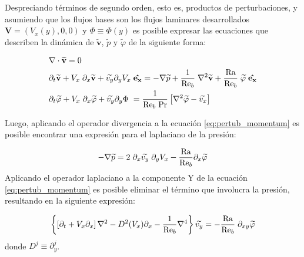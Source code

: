Despreciando términos de segundo orden, esto es, productos de perturbaciones, y asumiendo que los flujos bases son los flujos laminares desarrollados $\mathbf{V} = (V_x(y),0,0)$ y $\Phi \equiv \Phi(y)$ es posible expresar las ecuaciones que describen la dinámica de $\widetilde{\mathbf{v}}$, $\widetilde{p}$ y $\widetilde{\varphi}$ de la siguiente forma: 

\begin{align}
&\nabla \cdot \mathbf{\widetilde{v}} = 0
\label{eq:pertub_continuity} \\
&\partial_t \mathbf{\widetilde{v}} + V_x \hspace{1mm} \partial_x \mathbf{\widetilde{v}} + {\widetilde{v_y}} \partial_y V_x \hspace{1mm} \mathbf{\hat{e_x}} = - \nabla \widetilde{p} + \frac{1}{\text{Re}_b} \hspace{1mm} \nabla^2 \mathbf{\widetilde{v}} + \frac{\text{Ra}}{\text{Re}_b} \hspace{1mm} \widetilde{\varphi} \hspace{1mm}  \mathbf{\hat{e_x}} 
\label{eq:pertub_momentum} \\
&\partial_t {\widetilde{\varphi}} + V_x \hspace{1mm} \partial_x {\widetilde{\varphi}} + {\widetilde{v_y}} \partial_y \Phi \hspace{1mm} = \frac{1}{\text{Re}_b \hspace{1mm} \text{Pr}} \left[ \nabla^2 \widetilde{\varphi} - \widetilde{v_x} \right]
\label{eq:pertub_energy} 
\end{align} 

Luego, aplicando el operador divergencia a la ecuación \ref{eq:pertub_momentum} es posible encontrar una expresión para el laplaciano de la presión:

\begin{equation}
- \nabla \widetilde{p} = 2 \hspace{1mm} \partial_x \widetilde{v_y} \hspace{1mm} \partial_y V_x - \frac{\text{Ra}}{\text{Re}_b} \partial_x \widetilde{\varphi}
\label{eq:pressure_eigen}
\end{equation}
Aplicando el operador laplaciano a la componente Y de la ecuación \ref{eq:pertub_momentum} es posible eliminar el término que involucra la presión, resultando en la siguiente expresión:

\begin{equation}
\left\lbrace \left[ \partial_t + V_x \partial_x \right] \nabla^2 - D^2(V_x) \partial_x - \frac{1}{\text{Re}_b} \nabla^4 \right\rbrace \widetilde{v_y} = - \frac{\text{Ra}}{\text{Re}_b} \hspace{1mm} \partial_{xy} \widetilde{\varphi}
\label{eq:eigensis_ec1}
\end{equation}
donde $D^j \equiv \partial^j_y$.

